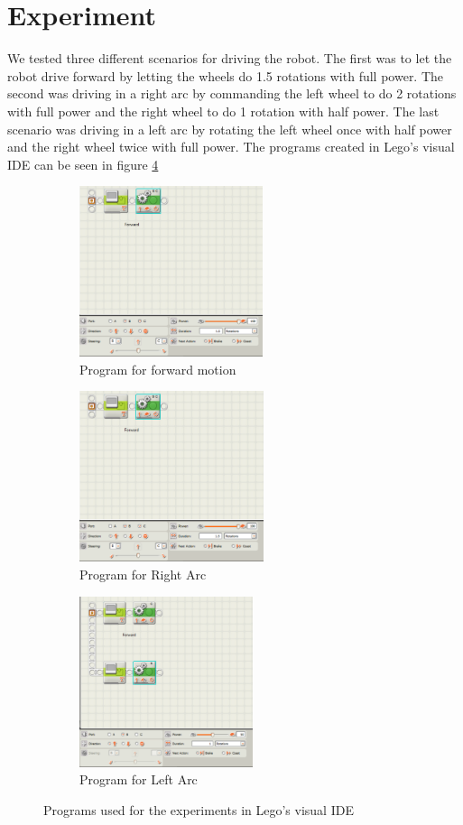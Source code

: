\documentclass[paper=a4, fontsize=11pt]{scrartcl} %
\numberwithin{equation}{section} %
\numberwithin{figure}{section} %
\numberwithin{table}{section} %
\begin{document}
\section{Experiment}
We tested three different scenarios for driving the robot.
The first was to let the robot drive forward by letting the wheels do 1.5 rotations with full power.
The second was driving in a right arc by commanding the left wheel to do 2 rotations with full power and the right wheel to do 1 rotation with half power.
The last scenario was driving in a left arc by rotating the left wheel once with half power and the right wheel twice with full power.
The programs created in Lego's visual IDE can be seen in figure \ref{fig:code}

\begin{figure}[h]
 
\begin{subfigure}{0.5\textwidth}
\includegraphics[width=0.9\linewidth, height=5cm]{forward_code.PNG} 
\caption{Program for forward motion}
\label{fig:sub_forward_code}
\end{subfigure}
\begin{subfigure}{0.5\textwidth}
\includegraphics[width=0.9\linewidth, height=5cm]{right_arc_code.PNG}
\caption{Program for Right Arc}
\label{fig:sub_right_code}
\end{subfigure}
\begin{subfigure}{0.5\textwidth}
\includegraphics[width=0.9\linewidth, height=5cm]{left_arc_code.PNG}
\caption{Program for Left Arc}
\label{fig:sub_left_code}
\end{subfigure}
 
\caption{Programs used for the experiments in Lego's visual IDE}
\label{fig:code}
\end{figure}
\end{document}
